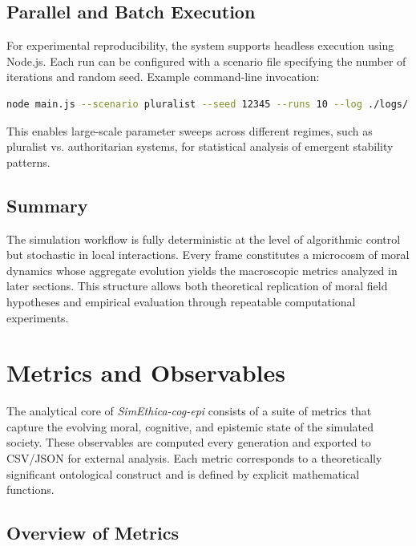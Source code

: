 \documentclass[11pt]{article}
\begin{document}
\subsection{Parallel and Batch Execution}

For experimental reproducibility, the system supports headless execution using Node.js.  
Each run can be configured with a scenario file specifying the number of iterations and random seed. Example command-line invocation:

\begin{lstlisting}[language=bash,caption={Batch-mode execution example}]
node main.js --scenario pluralist --seed 12345 --runs 10 --log ./logs/
\end{lstlisting}

This enables large-scale parameter sweeps across different regimes, such as pluralist vs. authoritarian systems, for statistical analysis of emergent stability patterns.

\subsection{Summary}

The simulation workflow is fully deterministic at the level of algorithmic control but stochastic in local interactions.  
Every frame constitutes a microcosm of moral dynamics whose aggregate evolution yields the macroscopic metrics analyzed in later sections.  
This structure allows both theoretical replication of moral field hypotheses and empirical evaluation through repeatable computational experiments.
\section{Metrics and Observables}

The analytical core of \textit{SimEthica-cog-epi} consists of a suite of metrics that capture the evolving moral, cognitive, and epistemic state of the simulated society. These observables are computed every generation and exported to CSV/JSON for external analysis. Each metric corresponds to a theoretically significant ontological construct and is defined by explicit mathematical functions.

\subsection{Overview of Metrics}
\end{document}
